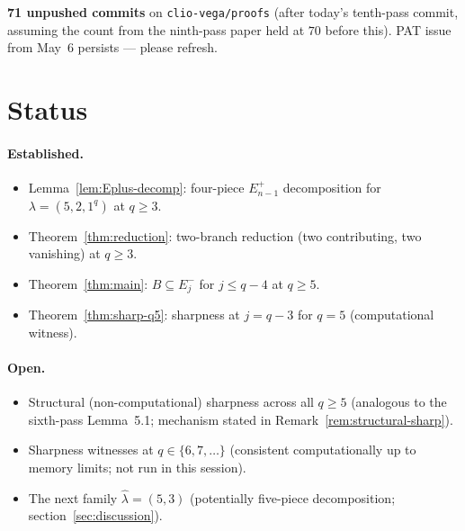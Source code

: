 \documentclass[11pt]{article}
\theoremstyle{definition}
\newcommand{\hatl}{\widehat\lambda}
\begin{document}
\textbf{71 unpushed commits} on \texttt{clio-vega/proofs} (after
today's tenth-pass commit, assuming the count from the ninth-pass paper
held at $70$ before this).  PAT issue from May~6 persists --- please
refresh.

\section{Status}\label{sec:status}

\paragraph{Established.}
\begin{itemize}[topsep=0.3em,itemsep=0.1em]
\item Lemma~\ref{lem:Eplus-decomp}: four-piece $E^+_{n-1}$
   decomposition for $\lambda = (5, 2, 1^q)$ at $q \ge 3$.
\item Theorem~\ref{thm:reduction}: two-branch reduction (two
   contributing, two vanishing) at $q \ge 3$.
\item Theorem~\ref{thm:main}: $B \subseteq E_j^-$ for $j \le q - 4$
   at $q \ge 5$.
\item Theorem~\ref{thm:sharp-q5}: sharpness at $j = q - 3$ for
   $q = 5$ (computational witness).
\end{itemize}

\paragraph{Open.}
\begin{itemize}[topsep=0.3em,itemsep=0.1em]
\item Structural (non-computational) sharpness across all $q \ge 5$
   (analogous to the sixth-pass Lemma~5.1; mechanism stated in
   Remark~\ref{rem:structural-sharp}).
\item Sharpness witnesses at $q \in \{6, 7, \ldots\}$ (consistent
   computationally up to memory limits; not run in this session).
\item The next family $\hatl = (5, 3)$ (potentially five-piece
   decomposition; section~\ref{sec:discussion}).
\end{itemize}
\end{document}
